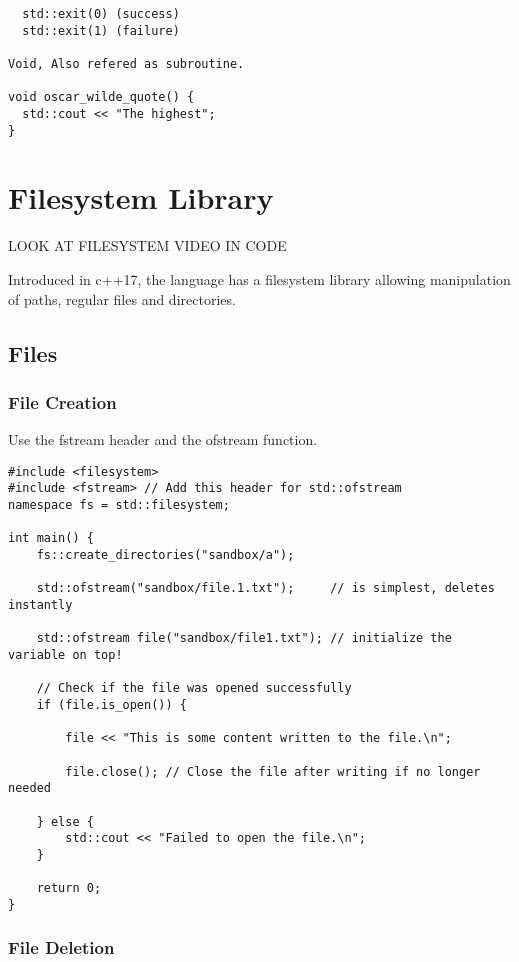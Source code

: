 \documentclass[openany]{report}
\begin{document}
\begin{verbatim}
  std::exit(0) (success)
  std::exit(1) (failure)

Void, Also refered as subroutine.

void oscar_wilde_quote() {
  std::cout << "The highest";
}
\end{verbatim}

\chapter{Filesystem Library}

LOOK AT FILESYSTEM VIDEO IN CODE

Introduced in c++17, the language has a filesystem library allowing
manipulation of paths, regular files and directories.

\section{Files}

\subsection{File Creation}

Use the fstream header and the ofstream function.

\begin{verbatim}
#include <filesystem>
#include <fstream> // Add this header for std::ofstream
namespace fs = std::filesystem;

int main() {
    fs::create_directories("sandbox/a");

    std::ofstream("sandbox/file.1.txt");     // is simplest, deletes instantly

    std::ofstream file("sandbox/file1.txt"); // initialize the variable on top!

    // Check if the file was opened successfully
    if (file.is_open()) {

        file << "This is some content written to the file.\n";

        file.close(); // Close the file after writing if no longer needed

    } else {
        std::cout << "Failed to open the file.\n";
    }

    return 0;
}
\end{verbatim}


\subsection{File Deletion}
\end{document}
